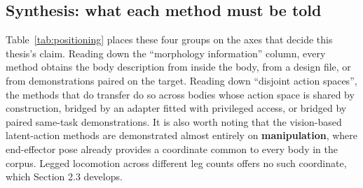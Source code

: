 \documentclass[12pt,a4paper,oneside]{report}
\begin{document}
\subsection{Synthesis: what each method must be told}
Table~\ref{tab:positioning} places these four groups on the axes that decide this thesis's claim.
Reading down the ``morphology information'' column, every method obtains the body description from
inside the body, from a design file, or from demonstrations paired on the target. Reading down
``disjoint action spaces'', the methods that do transfer do so across bodies whose action space is
shared by construction, bridged by an adapter fitted with privileged access, or bridged by paired
same-task demonstrations. It is also worth noting that the vision-based latent-action methods are
demonstrated almost entirely on \textbf{manipulation}, where end-effector pose already provides a
coordinate common to every body in the corpus. Legged locomotion across different leg counts offers
no such coordinate, which Section 2.3 develops.
\end{document}
